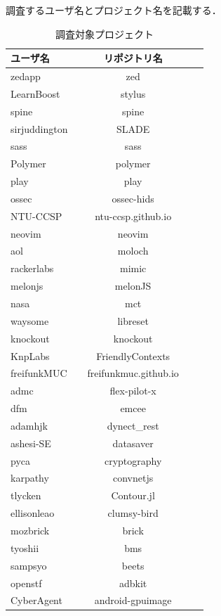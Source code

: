調査するユーザ名とプロジェクト名を記載する．
\begin{table}[H]
 \begin{center}
 \caption{調査対象プロジェクト}
  \begin{tabular}{|l|c|r||r|} \hline
    ユーザ名 & リポジトリ名\\ \hline
    zedapp　& zed\\ \hline
    LearnBoost　& stylus\\ \hline
    spine　& spine\\ \hline
    sirjuddington　& SLADE\\ \hline
    sass　& sass\\ \hline
    Polymer　& polymer\\ \hline
    play　& play\\ \hline
    ossec　& ossec-hids\\ \hline
    NTU-CCSP　& ntu-ccsp.github.io\\ \hline
    neovim　& neovim\\ \hline
    aol　& moloch\\ \hline
    rackerlabs　& mimic\\ \hline
    melonjs　& melonJS\\ \hline
    nasa　& mct\\ \hline
    waysome　& libreset\\ \hline
    knockout　& knockout\\ \hline
    KnpLabs　& FriendlyContexts\\ \hline
    freifunkMUC　& freifunkmuc.github.io\\ \hline
    admc　& flex-pilot-x\\ \hline
    dfm　& emcee\\ \hline
    adamhjk　& dynect\_rest\\ \hline
    ashesi-SE　& datasaver\\ \hline
    pyca　& cryptography\\ \hline
    karpathy　& convnetjs\\ \hline
    tlycken　& Contour.jl\\ \hline
    ellisonleao　& clumsy-bird\\ \hline
    mozbrick　& brick\\ \hline
    tyoshii　& bms\\ \hline
    sampsyo　& beets\\ \hline
    openstf　& adbkit\\ \hline
    CyberAgent　& android-gpuimage\\ \hline
  \end{tabular}
  \label{tab:project}
  \end{center}
\end{table}


